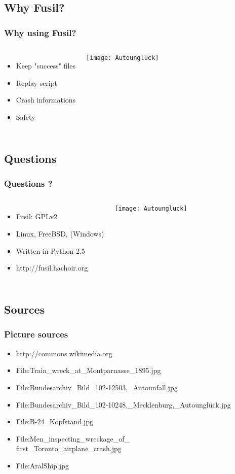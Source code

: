 \subsection{Why Fusil?}
\frame
{
    \frametitle{Why using Fusil?}

    \begin{columns}[c]
        \column{2.5in}
            \begin{itemize}
            \item Keep "success" files
            \item Replay script
            \item Crash informations
            \item Safety
            \end{itemize}

        \column{2.3in}
            \texttt{[image: Autoungluck]}
    \end{columns}
}

\subsection{Questions}
\frame
{
    \frametitle{Questions ?}

    \begin{columns}[c]
        \column{2.5in}
            \begin{itemize}
            \item Fusil: GPLv2
            \item Linux, FreeBSD, (Windows)
            \item Written in Python 2.5
            \item http://fusil.hachoir.org
            \end{itemize}

        \column{2.3in}
            \texttt{[image: Autoungluck]}
    \end{columns}

}

\subsection{Sources}
\frame
{
    \frametitle{Picture sources}

    \begin{itemize}
    \item http://commons.wikimedia.org
    \item File:Train\_wreck\_at\_Montparnasse\_1895.jpg
    \item File:Bundesarchiv\_Bild\_102-12503,\_Autounfall.jpg
    \item File:Bundesarchiv\_Bild\_102-10248,\_Mecklenburg,\_Autounglück.jpg
    \item File:B-24\_Kopfstand.jpg
    \item File:Men\_inspecting\_wreckage\_of\_ \\
    first\_Toronto\_airplane\_crash.jpg
    \item File:AralShip.jpg
    \end{itemize}

}

%

